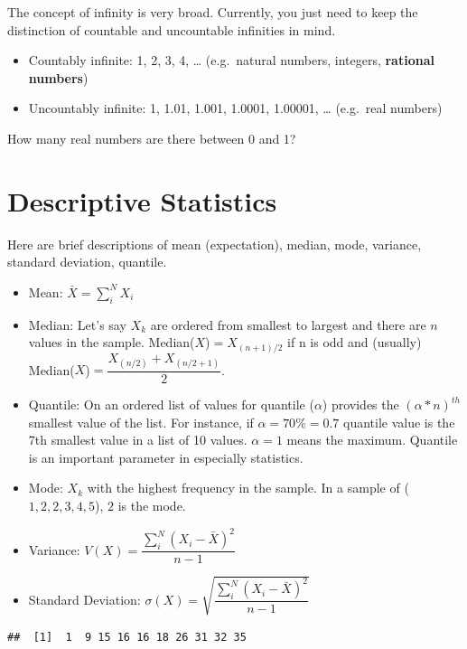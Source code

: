 \documentclass[]{book}
\providecommand{\tightlist}{%
  \setlength{\itemsep}{0pt}\setlength{\parskip}{0pt}}
\theoremstyle{definition}
\theoremstyle{definition}
\theoremstyle{definition}
\theoremstyle{remark}
\begin{document}
The concept of infinity is very broad. Currently, you just need to keep
the distinction of countable and uncountable infinities in mind.

\begin{itemize}
\tightlist
\item
  Countably infinite: 1, 2, 3, 4, \ldots{} (e.g.~natural numbers,
  integers, \textbf{rational numbers})
\item
  Uncountably infinite: 1, 1.01, 1.001, 1.0001, 1.00001, \ldots{}
  (e.g.~real numbers)
\end{itemize}

How many real numbers are there between 0 and 1?

\hypertarget{descriptive-statistics}{%
\section{Descriptive Statistics}\label{descriptive-statistics}}

Here are brief descriptions of mean (expectation), median, mode,
variance, standard deviation, quantile.

\begin{itemize}
\item
  Mean: \(\bar{X} = \sum_i^N X_i\)
\item
  Median: Let's say \(X_k\) are ordered from smallest to largest and
  there are \(n\) values in the sample. Median(\(X\))\(=X_{(n+1)/2}\) if
  n is odd and (usually)
  Median(\(X\))\(=\dfrac{X_{(n/2)} + X_{(n/2+1)}}{2}\).
\item
  Quantile: On an ordered list of values for quantile (\(\alpha\))
  provides the \((\alpha*n)^{th}\) smallest value of the list. For
  instance, if \(\alpha = 70\% = 0.7\) quantile value is the 7th
  smallest value in a list of 10 values. \(\alpha = 1\) means the
  maximum. Quantile is an important parameter in especially statistics.
\item
  Mode: \(X_k\) with the highest frequency in the sample. In a sample of
  (\(1,2,2,3,4,5\)), \(2\) is the mode.
\item
  Variance: \(V(X) = \dfrac{\sum_i^N (X_i - \bar{X})^2}{n-1}\)
\item
  Standard Deviation:
  \(\sigma(X) = \sqrt{\dfrac{\sum_i^N (X_i - \bar{X})^2}{n-1}}\)
\end{itemize}

\begin{verbatim}
##  [1]  1  9 15 16 16 18 26 31 32 35
\end{verbatim}
\end{document}
